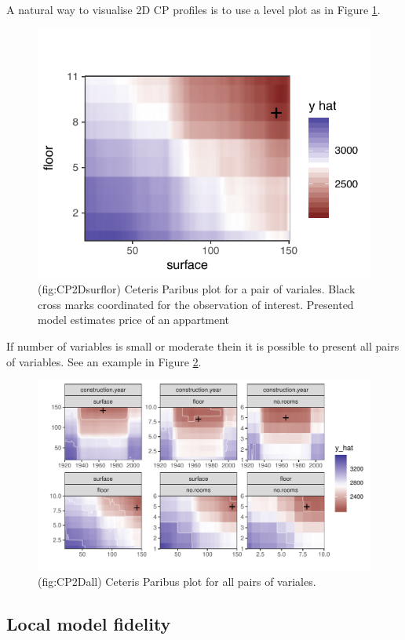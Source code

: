 \documentclass[]{krantz}
\theoremstyle{definition}
\theoremstyle{definition}
\theoremstyle{definition}
\theoremstyle{remark}
\begin{document}
A natural way to visualise 2D CP profiles is to use a level plot as in
Figure \ref{fig:CP2Dsurflor}.

\begin{figure}

{\centering \includegraphics[width=0.6\linewidth]{figure/cp_2d_surf_floor} 

}

\caption{(fig:CP2Dsurflor) Ceteris Paribus plot for a pair of variales. Black cross marks coordinated for the observation of interest. Presented model estimates price of an appartment}\label{fig:CP2Dsurflor}
\end{figure}

If number of variables is small or moderate thein it is possible to
present all pairs of variables. See an example in Figure
\ref{fig:CP2Dall}.

\begin{figure}

{\centering \includegraphics[width=0.9\linewidth]{figure/cp_2d_all} 

}

\caption{(fig:CP2Dall) Ceteris Paribus plot for all pairs of variales.}\label{fig:CP2Dall}
\end{figure}

\hypertarget{local-model-fidelity}{%
\subsection{Local model fidelity}\label{local-model-fidelity}}
\end{document}
